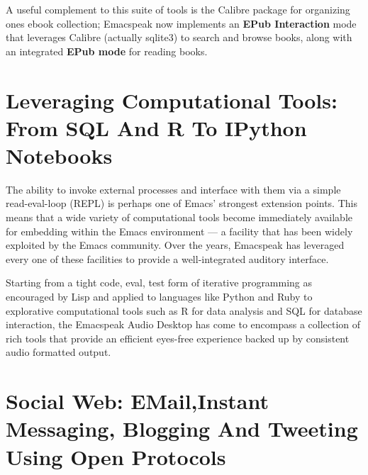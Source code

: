 \documentclass[11pt]{article}
\begin{document}
A useful complement to this suite of tools is the Calibre package
for organizing ones ebook collection; Emacspeak now implements an
\textbf{EPub Interaction} mode that leverages Calibre (actually sqlite3)
to search and browse books, along with an integrated \textbf{EPub mode}
for reading books.

\section{Leveraging Computational Tools: From SQL And R To IPython Notebooks}
\label{sec-12}

The ability to invoke external processes and interface with them
via a simple read-eval-loop (REPL) is perhaps one of Emacs'
strongest extension points. This means that a wide variety of
computational tools become immediately available for embedding
within the Emacs environment — a facility that has been widely
exploited by the Emacs community. Over the years, Emacspeak has
leveraged every one of these facilities to provide a
well-integrated auditory interface.

Starting from a tight code, eval, test form of iterative
programming as encouraged by Lisp and applied to languages like
Python and Ruby to explorative computational tools such as R for
data analysis and SQL for database interaction, the Emacspeak
Audio Desktop has come to encompass a collection of rich tools
that provide an efficient eyes-free experience backed up by
consistent audio formatted output.

\section{Social Web: EMail,Instant Messaging, Blogging  And Tweeting Using Open Protocols}
\label{sec-13}
\end{document}
